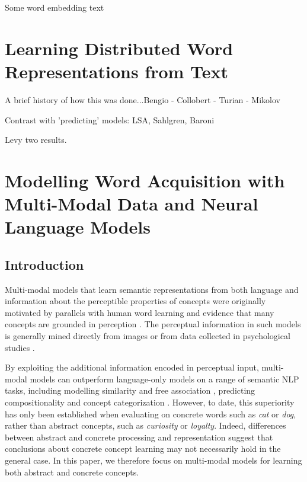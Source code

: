 
Some word embedding text

\section{Learning Distributed Word Representations from Text}

A brief history of how this was done...Bengio - Collobert - Turian - Mikolov

Contrast with 'predicting' models: LSA, Sahlgren, Baroni

Levy two results. 

\section{Modelling Word Acquisition with Multi-Modal Data and Neural Language Models}


\subsection{Introduction}

Multi-modal models that learn semantic representations from both language and information about the perceptible properties of concepts were originally motivated by parallels with human word learning \cite{andrews2009integrating} and evidence that many concepts are grounded in perception \cite{barsalou2005situating}. The perceptual information in such models is generally mined directly from images \cite{feng2010visual,bruni2012distributional} or from data collected in psychological studies \cite{silberer2012grounded,rollermultimodal}. 

By exploiting the additional information encoded in perceptual input, multi-modal models can outperform language-only models on a range of semantic NLP tasks, including modelling similarity \cite{bruni2014multimodal} and free association \cite{silberer2012grounded}, predicting compositionality \cite{rollermultimodal} and concept categorization \cite{silberer2014learning}. However, to date, this superiority has only been established when evaluating on concrete words such as \emph{cat} or \emph{dog}, rather than abstract concepts, such as \emph{curiosity} or \emph{loyalty}. Indeed, differences between abstract and concrete processing and representation \cite{paivio1991dual,hill2013quantitative} suggest that conclusions about concrete concept learning may not necessarily hold in the general case. In this paper, we therefore focus on multi-modal models for learning both abstract and concrete concepts.

